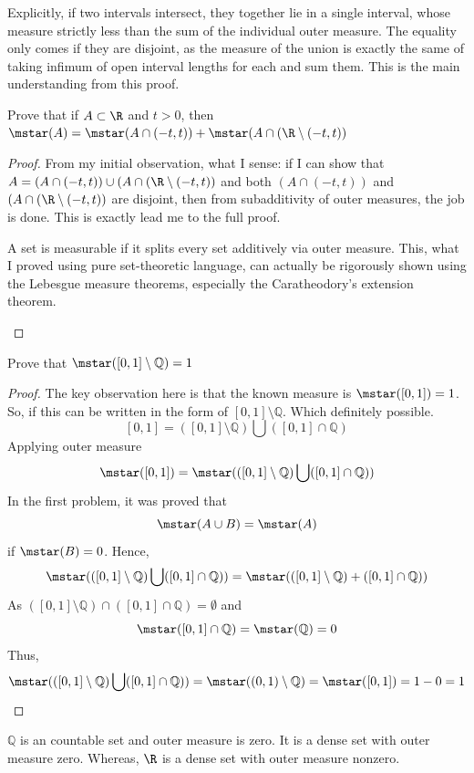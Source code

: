     \begin{takeaway}
        Explicitly, if two intervals intersect, they together lie in a single interval, whose measure strictly less than the sum of the individual outer measure. The equality only comes if they are disjoint, as the measure of the union is exactly the same of taking infimum of open interval lengths for each and sum them. This is the main understanding from this proof. 
    \end{takeaway}
    \begin{exercise}
        Prove that if $A\subset \R$ and $t>0$, then $\mstar(A)=\mstar(A\cap (-t, t)) + \mstar(A\cap (\R\setminus(-t, t))$
    \end{exercise}
    \begin{proof}
        From my initial observation, what I sense: if I can show that $A=(A\cap (-t, t))\cup (A\cap (\R\setminus(-t, t))$ and both $(A\cap (-t, t))$ and $(A\cap (\R\setminus(-t, t))$ are disjoint, then from subadditivity of outer measures, the job is done. This is exactly lead me to the full proof. 
        \begin{takeaway}
            A set is measurable if it splits every set additively via outer measure. This, what I proved using pure set-theoretic language, can actually be rigorously shown using the Lebesgue measure theorems, especially the Caratheodory's extension theorem. 
        \end{takeaway}
    \end{proof}
    \begin{exercise}
        Prove that $\mstar([0, 1]\setminus \mathbb{Q}) = 1$
    \end{exercise}
    \begin{proof}
        The key observation here is that the known measure is $\mstar([0, 1])=1$. So, if this can be written in the form of $[0, 1]\setminus \mathbb{Q}$. Which definitely possible. 
    \[
    [0, 1] = ([0, 1]\setminus \mathbb{Q})\bigcup([0, 1]\cap \mathbb{Q})
    \]
    Applying outer measure
    \[
    \mstar([0, 1]) = \mstar(([0, 1]\setminus \mathbb{Q})\bigcup([0, 1]\cap \mathbb{Q}))
    \]
    In the first problem, it was proved that 
    \[
    \mstar(A\cup B)= \mstar(A)
    \]
    if $\mstar(B) = 0$. Hence,
    \[
    \mstar(([0, 1]\setminus \mathbb{Q})\bigcup([0, 1]\cap \mathbb{Q}))= \mstar(([0, 1]\setminus \mathbb{Q})+([0, 1]\cap \mathbb{Q}))
    \]
    As $([0, 1]\setminus \mathbb{Q})\cap([0, 1]\cap \mathbb{Q})=\emptyset$ and 
    \[
    \mstar([0, 1]\cap \mathbb{Q})=\mstar(\mathbb{Q)}=0
    \]
    Thus,
    \[
    \mstar(([0, 1]\setminus \mathbb{Q})\bigcup([0, 1]\cap \mathbb{Q}))=\mstar((0,1)\setminus\mathbb{Q})=\mstar([0,1])=1-0=1
    \]
    \end{proof}
\begin{takeaway}
    $\mathbb{Q}$ is an countable set and outer measure is zero. It is a dense set with outer measure zero. Whereas, $\R$ is a dense set with outer measure nonzero. 
\end{takeaway}